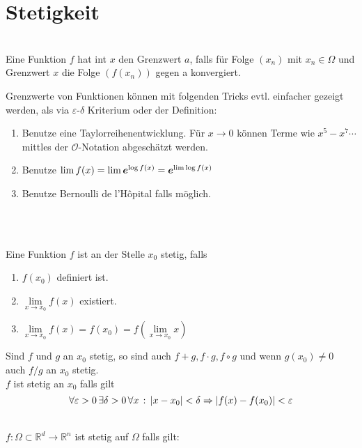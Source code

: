 \section{Stetigkeit}
\begin{multicols}{2}
	\begin{definition}\hfill\\
		Eine Funktion $f$ hat int $x$ den Grenzwert $a$, falls für  Folge $(x_n)$ mit $x_n \in \Omega$ und Grenzwert $x$ die Folge $(f(x_n))$ gegen a konvergiert.
	\end{definition}
	\begin{hint}
		Grenzwerte von Funktionen können mit folgenden Tricks evtl. einfacher gezeigt werden, als via $\varepsilon$-$\delta$ Kriterium oder der Definition: 
		\begin{enumerate}
			\item Benutze eine Taylorreihenentwicklung. Für $x \to 0$ können Terme wie $x^5 - x^7 \cdots$ mittles der $\mathcal{O}$-Notation abgeschätzt werden.
			\item Benutze $\lim f(x) = \lim \boldsymbol{e} ^{\log f(x)} = \boldsymbol{e} ^{\lim \log f(x)}$
			\item Benutze Bernoulli de l'Hôpital falls möglich.
		\end{enumerate}
	\end{hint}
	\\[1em]
	\begin{definition}[Stetigkeit]\hfill\\
		Eine Funktion $f$ ist an der Stelle $x_0$ stetig, falls 
		\begin{enumerate}
			\item $f(x_0)$ definiert ist.				
			\item $\lim\limits_{x \to x_0} f(x)$ existiert.
			\item $\lim\limits_{x \to x_0} f(x) = f(x_0) = f(\lim\limits_{x \to x_0} x)$
		\end{enumerate}
		Sind $f$ und $g$ an $x_0$ stetig, so sind auch $f + g, f \cdot g, f \circ g$ und wenn $g(x_0) \neq 0$ auch $f/g$ an $x_0$ stetig. \\ 
		$f$ ist stetig an $x_0$ falls gilt
		$$ \forall \varepsilon > 0 \, \exists \delta > 0 \, \forall x \, : \, \left\vert x - x_0 \right\vert < \delta \Rightarrow \left\vert  f(x)-f(x_0)  \right\vert < \varepsilon $$
	\end{definition}
		\begin{theorem}\hfill\\
			$f: \Omega \subset \mathbb{R}^d \to \mathbb{R}^n $ ist stetig auf $\Omega$ falls gilt:

\end{theorem}
\end{multicols}
